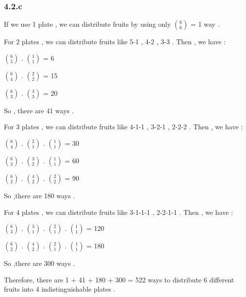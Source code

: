 \documentclass[12pt]{article}
\begin{document}
\subsubsection*{4.2.c}
\hspace{15px} If we use 1 plate , we can distribute fruits by using only $6 \choose 6$ = 1 way . \\ \par 
For 2 plates , we can distribute fruits like 5-1 , 4-2 , 3-3 . Then , we have : \\ \par
$6 \choose 5$ . $1 \choose 1$ = 6 \\ \par 
$6 \choose 4$ . $2 \choose 2$ = 15 \\ \par 
$6 \choose 3$ . $3 \choose 3$ = 20 \\ \par 
So , there are 41 ways .\\ \par
For 3 plates , we can distribute fruits like 4-1-1 , 3-2-1 , 2-2-2 . Then , we have : \\ \par 
$6 \choose 4$ . $2 \choose 1$ . $1 \choose 1$ = 30 \\ \par 
$6 \choose 3$ . $3 \choose 2$ . $1 \choose 1$ = 60 \\ \par 
$6 \choose 2$ . $4 \choose 2$ . $2 \choose 2$ = 90 \\ \par 
So ,there are 180 ways . \\ \par 
For 4 plates , we can distribute fruits like 3-1-1-1 , 2-2-1-1 . Then , we have : \\ \par 
$6 \choose 3$ . $3 \choose 1$ . $2 \choose 1$ . $1 \choose 1$ = 120 \\ \par 
$6 \choose 2$ . $4 \choose 2$ . $2 \choose 1$ . $1 \choose 1$ = 180 \\ \par 
So ,there are 300 ways . \\ \par 
Therefore, there are 1 + 41 + 180 + 300 = 522 ways to distribute 6 different fruits into 4 indistinguishable plates .
\end{document}
